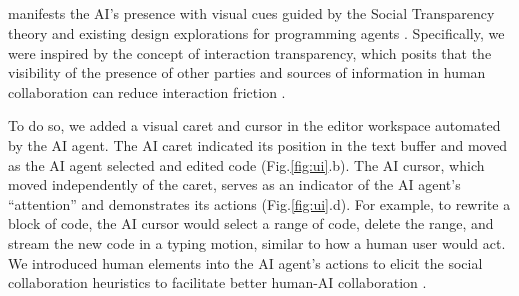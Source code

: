 

\subsection{}
\sys{} manifests the AI's presence with visual cues guided by the Social Transparency theory \cite{stuart2012social, erickson2003social} and existing design explorations for programming agents \cite{ehsan2021expanding, cursorcopilot++, geniusbydiagram}.
Specifically, we were inspired by the concept of interaction transparency, which posits that the visibility of the presence of other parties and sources of information in human collaboration can reduce interaction friction \cite{gutwin2004group, erickson2003social}.

To do so, we added a visual caret and cursor in the editor workspace automated by the AI agent. The AI caret indicated its position in the text buffer and moved as the AI agent selected and edited code (Fig.\ref{fig:ui}.b). 
The AI cursor, which moved independently of the caret, serves as an indicator of the AI agent’s “attention” and demonstrates its actions (Fig.\ref{fig:ui}.d). 
For example, to rewrite a block of code, the AI cursor would select a range of code, delete the range, and stream the new code in a typing motion, similar to how a human user would act.
We introduced human elements into the AI agent's actions to elicit the social collaboration heuristics to facilitate better human-AI collaboration \cite{ehsan2021expanding}.


